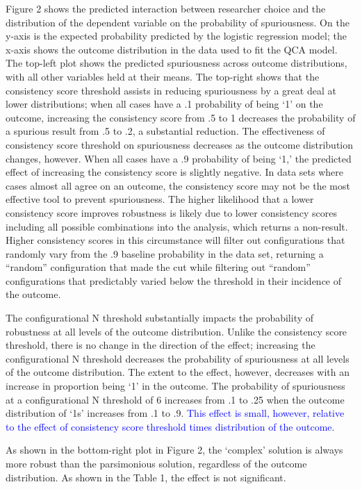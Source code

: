 \documentclass[12pt]{article}
\begin{document}
{{{{Figure 2 shows the predicted interaction between researcher choice and the distribution of the dependent variable on the probability of spuriousness. On the y-axis is the expected probability predicted by the logistic regression model; the x-axis shows the outcome distribution in the data used to fit the QCA model. The top-left plot shows the predicted spuriousness across outcome distributions, with all other variables held at their means. The top-right shows that the consistency score threshold assists in reducing spuriousness by a great deal at lower distributions; when all cases have a .1 probability of being `1' on the outcome, increasing the consistency score from .5 to 1 decreases the probability of a spurious result from .5 to .2, a substantial reduction. The effectiveness of consistency score threshold on spuriousness decreases as the outcome distribution changes, however. When all cases have a .9 probability of being `1,' the predicted effect of increasing the consistency score is slightly negative. In data sets where cases almost all agree on an outcome, the consistency score may not be the most effective tool to prevent spuriousness. The higher likelihood that a lower consistency score improves robustness is likely due to lower consistency scores including all possible combinations into the analysis, which returns a non-result. Higher consistency scores in this circumstance will filter out configurations that randomly vary from the .9 baseline probability in the data set, returning a ``random'' configuration that made the cut while filtering out ``random'' configurations that predictably varied below the threshold in their incidence of the outcome.

The configurational N threshold substantially impacts the probability of robustness at all levels of the outcome distribution. Unlike the consistency score threshold, there is no change in the direction of the effect; increasing the configurational N threshold decreases the probability of spuriousness at all levels of the outcome distribution. The extent to the effect, however, decreases with an increase in proportion being `1' in the outcome. The probability of spuriousness at a configurational N threshold of 6 increases from .1 to .25 when the outcome distribution of `1s' increases from .1 to .9. \textcolor{blue} {This effect is small, however, relative to the effect of consistency score threshold times distribution of the outcome.}

As shown in the bottom-right plot in Figure 2, the `complex' solution is always more robust than the parsimonious solution, regardless of the outcome distribution. As shown in the Table 1, the effect is not significant. 

}}}}
\end{document}
